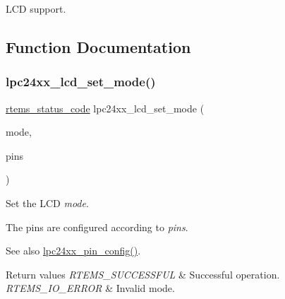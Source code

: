 L\+CD support.

\subsection{Function Documentation}
\mbox{\label{group__lpc__dma_gae45d4f5831367f38cad384d75da01268}} 
\subsubsection{\texorpdfstring{lpc24xx\_lcd\_set\_mode()}{lpc24xx\_lcd\_set\_mode()}}
{\footnotesize\ttfamily \mbox{\hyperlink{group__ClassicStatus_ga545d41846817eaba6143d52ee4d9e9fe}{rtems\+\_\+status\+\_\+code}} lpc24xx\+\_\+lcd\+\_\+set\+\_\+mode (\begin{DoxyParamCaption}\item[{lpc24xx\+\_\+lcd\+\_\+mode}]{mode,  }\item[{const \mbox{\hyperlink{unionlpc24xx__pin__range}{lpc24xx\+\_\+pin\+\_\+range}} $\ast$}]{pins }\end{DoxyParamCaption})}



Set the L\+CD {\itshape mode}. 

The pins are configured according to {\itshape pins}.

\begin{DoxySeeAlso}{See also}
\mbox{\hyperlink{group__lpc24xx__io_gaaa704e4a54e338c74eebce54e23547cd}{lpc24xx\+\_\+pin\+\_\+config()}}.
\end{DoxySeeAlso}

\begin{DoxyRetVals}{Return values}
{\em R\+T\+E\+M\+S\+\_\+\+S\+U\+C\+C\+E\+S\+S\+F\+UL} & Successful operation. \\
\hline
{\em R\+T\+E\+M\+S\+\_\+\+I\+O\+\_\+\+E\+R\+R\+OR} & Invalid mode. \\
\hline
\end{DoxyRetVals}
